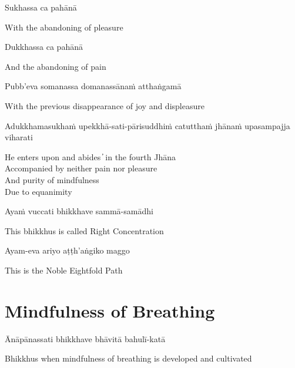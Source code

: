Sukhassa ca pahānā

\begin{cprenglish}
  With the abandoning of pleasure
\end{cprenglish}

Dukkhassa ca pahānā

\begin{cprenglish}
  And the abandoning of pain
\end{cprenglish}

Pubb’eva somanassa domanassānaṁ atthaṅgamā

\begin{cprenglish}
  With the previous disappearance of joy and displeasure
\end{cprenglish}

Adukkhamasukhaṁ upekkhā-sati-pārisuddhiṁ catutthaṁ jhānaṁ upasampajja viharati

\begin{cprenglish}
  He enters upon and abides  ̓  in the fourth Jhāna\\
  Accompanied by neither pain nor pleasure\\
  And purity of mindfulness\\
  Due to equanimity
\end{cprenglish}

Ayaṁ vuccati bhikkhave sammā-samādhi

\begin{cprenglish}
  This bhikkhus is called Right Concentration
\end{cprenglish}

Ayam-eva ariyo aṭṭh'aṅgiko maggo

\begin{cprenglish}
  This is the Noble Eightfold Path
\end{cprenglish}

\suttaRef{[SN 45.8]}

\clearpage

\section{Mindfulness of Breathing}

\begin{leader}
\end{leader}

Ānāpānassati bhikkhave bhāvitā bahulī-katā

\begin{cprenglish}
  Bhikkhus when mindfulness of breathing is developed and cultivated
\end{cprenglish}

